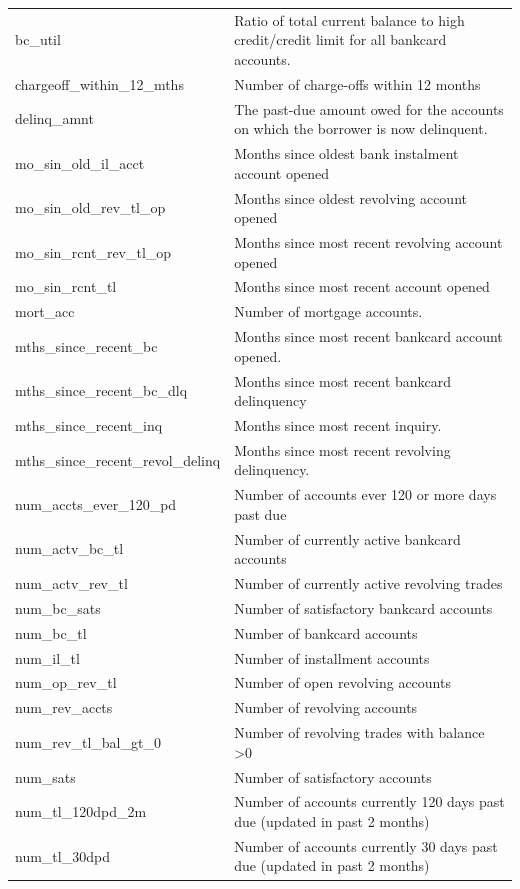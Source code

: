 \documentclass[11pt,]{report}
\begin{document}
\begin{longtable}[t]{>{\raggedright\arraybackslash}p{7cm}>{\raggedright\arraybackslash}p{7cm}}
\addlinespace
bc\_util & Ratio of total current balance to high credit/credit limit for all bankcard accounts.\\
chargeoff\_within\_12\_mths & Number of charge-offs within 12 months\\
delinq\_amnt & The past-due amount owed for the accounts on which the borrower is now delinquent.\\
mo\_sin\_old\_il\_acct & Months since oldest bank instalment account opened\\
mo\_sin\_old\_rev\_tl\_op & Months since oldest revolving account opened\\
\addlinespace
mo\_sin\_rcnt\_rev\_tl\_op & Months since most recent revolving account opened\\
mo\_sin\_rcnt\_tl & Months since most recent account opened\\
mort\_acc & Number of mortgage accounts.\\
mths\_since\_recent\_bc & Months since most recent bankcard account opened.\\
mths\_since\_recent\_bc\_dlq & Months since most recent bankcard delinquency\\
\addlinespace
mths\_since\_recent\_inq & Months since most recent inquiry.\\
mths\_since\_recent\_revol\_delinq & Months since most recent revolving delinquency.\\
num\_accts\_ever\_120\_pd & Number of accounts ever 120 or more days past due\\
num\_actv\_bc\_tl & Number of currently active bankcard accounts\\
num\_actv\_rev\_tl & Number of currently active revolving trades\\
\addlinespace
num\_bc\_sats & Number of satisfactory bankcard accounts\\
num\_bc\_tl & Number of bankcard accounts\\
num\_il\_tl & Number of installment accounts\\
num\_op\_rev\_tl & Number of open revolving accounts\\
num\_rev\_accts & Number of revolving accounts\\
\addlinespace
num\_rev\_tl\_bal\_gt\_0 & Number of revolving trades with balance >0\\
num\_sats & Number of satisfactory accounts\\
num\_tl\_120dpd\_2m & Number of accounts currently 120 days past due (updated in past 2 months)\\
num\_tl\_30dpd & Number of accounts currently 30 days past due (updated in past 2 months)\\

\end{longtable}
\end{document}
